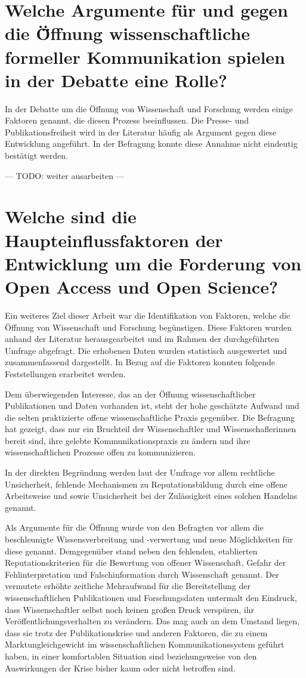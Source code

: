 \section{Welche Argumente für und gegen die Ö̈ffnung wissenschaftliche formeller Kommunikation spielen in der Debatte eine Rolle?}

In der Debatte um die Öffnung von Wissenschaft und Forschung werden einige Faktoren genannt, die diesen Prozess beeinflussen. Die Presse- und Publikationsfreiheit wird in der Literatur häufig als Argument gegen diese Entwicklung angeführt. In der Befragung konnte diese Annahme nicht eindeutig bestätigt werden.

--- TODO: weiter ausarbeiten ---

\section{Welche sind die Haupteinflussfaktoren der Entwicklung um die Forderung von Open Access und Open Science?}

Ein weiteres Ziel dieser Arbeit war die Identifikation von Faktoren, welche die Öffnung von Wissenschaft und Forschung begünstigen. Diese Faktoren wurden anhand der Literatur herausgearbeitet und im Rahmen der durchgeführten Umfrage abgefragt. Die erhobenen Daten wurden statistisch ausgewertet und zusammenfassend dargestellt. In Bezug auf die Faktoren konnten folgende Feststellungen erarbeitet werden.

Dem überwiegenden Interesse, das an der Öffnung wissenschaftlicher Publikationen und Daten vorhanden ist, steht der hohe geschätzte Aufwand und die selten praktizierte offene wissenschaftliche Praxis gegenüber. Die Befragung hat gezeigt, dass nur ein Bruchteil der Wissenschaftler und Wissenschaflerinnen bereit sind, ihre gelebte Kommunikationspraxis zu ändern und ihre wissenschaftlichen Prozesse offen zu kommunizieren.

In der direkten Begründung werden laut der Umfrage vor allem rechtliche Unsicherheit, fehlende Mechanismen zu Reputationsbildung durch eine offene Arbeitsweise und sowie Unsicherheit bei der Zulässigkeit eines solchen Handelns genannt.

Als Argumente für die Öffnung wurde von den Befragten vor allem die beschleunigte Wissensverbreitung und -verwertung und neue Möglichkeiten für diese genannt. Demgegenüber stand neben den fehlenden, etablierten Reputationskriterien für die Bewertung von offener Wissenschaft, Gefahr der Fehlinterpretation und Falschinformation durch Wissenschaft genannt. Der vermutete erhöhte zeitliche Mehraufwand für die Bereitstellung der wissenschaftlichen Publikationen und Forschungsdaten untermalt den Eindruck, dass Wissenschaftler selbst noch keinen großen Druck verspüren, ihr Veröffentlichungsverhalten zu verändern. Das mag auch an dem Umstand liegen, dass sie trotz der Publikationskrise und anderen Faktoren, die zu einem Marktungleichgewicht im wissenschaftlichen Kommunikationssystem geführt haben, in einer komfortablen Situation sind beziehungsweise von den Auswirkungen der Krise bisher kaum oder nicht betroffen sind.

